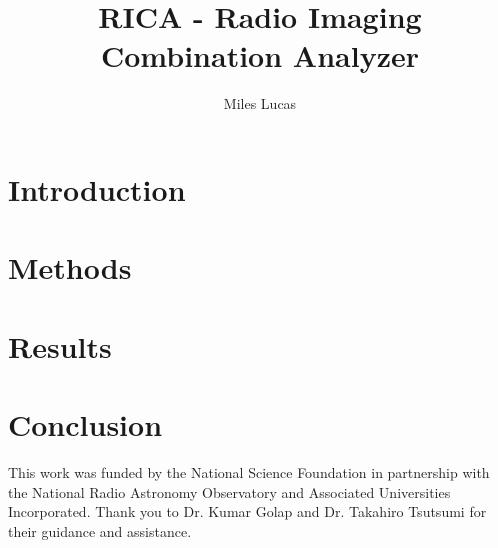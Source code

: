 \documentclass[manuscript,linenumbers]{aastex62}
\begin{document}
\title{RICA - Radio Imaging Combination Analyzer}
\author{Miles Lucas}
 

\begin{abstract}

\end{abstract}

\section{Introduction}

\section{Methods}

\section{Results}

\section{Conclusion}


\acknowledgements
This work was funded by the National Science Foundation in partnership with the National Radio Astronomy Observatory and Associated Universities Incorporated. Thank you to Dr. Kumar Golap and Dr. Takahiro Tsutsumi for their guidance and assistance.
\end{document}
